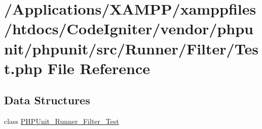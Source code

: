 \hypertarget{_runner_2_filter_2_test_8php}{}\section{/\+Applications/\+X\+A\+M\+P\+P/xamppfiles/htdocs/\+Code\+Igniter/vendor/phpunit/phpunit/src/\+Runner/\+Filter/\+Test.php File Reference}
\label{_runner_2_filter_2_test_8php}
\subsection*{Data Structures}
\begin{DoxyCompactItemize}
\item 
class \mbox{\hyperlink{class_p_h_p_unit___runner___filter___test}{P\+H\+P\+Unit\+\_\+\+Runner\+\_\+\+Filter\+\_\+\+Test}}
\end{DoxyCompactItemize}
